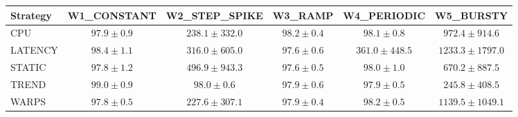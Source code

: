 \begin{tabular}{lccccc}
\toprule
Strategy & W1\_CONSTANT & W2\_STEP\_SPIKE & W3\_RAMP & W4\_PERIODIC & W5\_BURSTY \\
\midrule
CPU & $97.9 \pm 0.9$ & $238.1 \pm 332.0$ & $98.2 \pm 0.4$ & $98.1 \pm 0.8$ & $972.4 \pm 914.6$ \\
LATENCY & $98.4 \pm 1.1$ & $316.0 \pm 605.0$ & $97.6 \pm 0.6$ & $361.0 \pm 448.5$ & $1233.3 \pm 1797.0$ \\
STATIC & $97.8 \pm 1.2$ & $496.9 \pm 943.3$ & $97.6 \pm 0.5$ & $98.0 \pm 1.0$ & $670.2 \pm 887.5$ \\
TREND & $99.0 \pm 0.9$ & $98.0 \pm 0.6$ & $97.9 \pm 0.6$ & $97.9 \pm 0.5$ & $245.8 \pm 408.5$ \\
WARPS & $97.8 \pm 0.5$ & $227.6 \pm 307.1$ & $97.9 \pm 0.4$ & $98.2 \pm 0.5$ & $1139.5 \pm 1049.1$ \\
\bottomrule
\end{tabular}